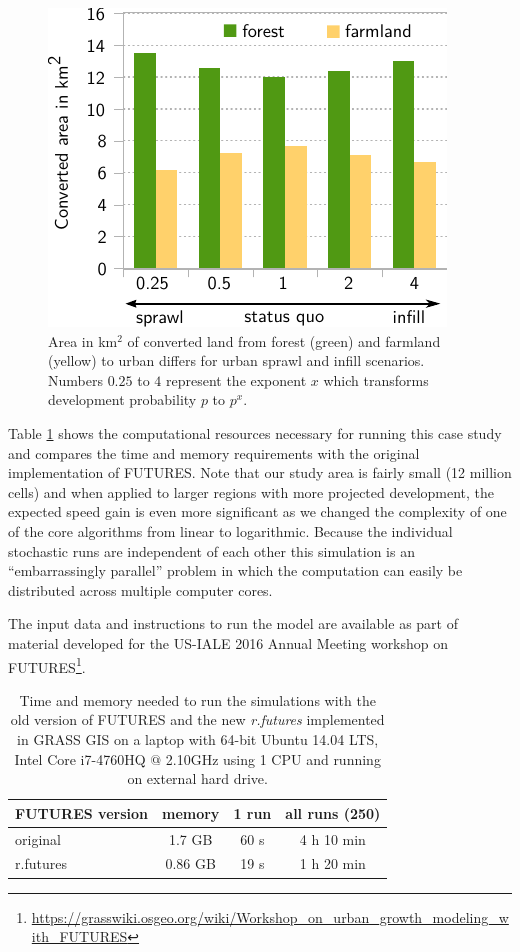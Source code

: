 \documentclass{isprs}
\begin{document}
\begin{figure}[!ht]
 \centering
 \includegraphics[width=0.9\columnwidth]{./figures/converted_land_new.pdf}
 \caption{Area in km$^2$ of converted land from forest (green) and farmland (yellow) to urban
 differs for urban sprawl and infill scenarios. Numbers $0.25$ to $4$ represent the exponent $x$ which
 transforms development probability $p$ to $p^x$.}
 \label{fig:results_plot}
\end{figure}


Table \ref{tab:benchmark} shows the computational resources
necessary for running this case study and compares 
the time and memory requirements with the original
implementation of FUTURES. Note that
our study area is fairly small (12 million cells)
and when applied to larger regions with more projected development, 
the expected speed gain is even more significant
as we changed the complexity of one of the core algorithms from linear to logarithmic.
Because the individual stochastic runs are independent of each other
this simulation is an
``embarrassingly parallel''  problem \cite{herlihy2012art}
in which the computation can easily be distributed across multiple computer cores.

The input data and instructions to run the model are available as part of material
developed for the US-IALE 2016 Annual Meeting workshop on FUTURES\footnote{\url{https://grasswiki.osgeo.org/wiki/Workshop_on_urban_growth_modeling_with_FUTURES}}.

\begin{table}[htp]
 \centering
\begin{center}
\begin{tabular}{lccc}
\toprule
FUTURES version & memory & 1 run & all runs (250)\\ \midrule
original & 1.7 GB & 60 s & 4 h 10 min\\
r.futures  & 0.86 GB & 19 s & 1 h 20 min\\
\bottomrule
\end{tabular}
\end{center}
 \caption{Time and memory needed to run the simulations
 with the old version of FUTURES and the new  \emph{r.futures}
 implemented in GRASS GIS on a laptop with 64-bit Ubuntu 14.04 LTS,
 Intel Core i7-4760HQ $@$ 2.10GHz using 1 CPU and running on external hard drive.}
 \label{tab:benchmark}
\end{table}
\end{document}
